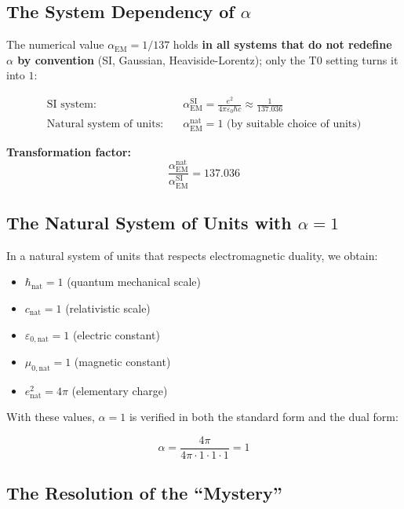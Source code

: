 \subsection{The System Dependency of $\alpha$}
\label{subsec:alpha_system_dependency}

The numerical value $\alpha_{\text{EM}} = 1/137$ holds \textbf{in all systems that do not redefine $\alpha$ by convention} (SI, Gaussian, Heaviside-Lorentz); only the T0 setting turns it into $1$:

\begin{align}
	\text{SI system:} \quad &\alpha_{\text{EM}}^{\text{SI}} = \frac{e^2}{4\pi\varepsilon_0\hbar c} \approx \frac{1}{137.036} \\
	\text{Natural system of units:} \quad &\alpha_{\text{EM}}^{\text{nat}} = 1 \text{ (by suitable choice of units)}
\end{align}

\textbf{Transformation factor:}
\begin{equation}
	\frac{\alpha_{\text{EM}}^{\text{nat}}}{\alpha_{\text{EM}}^{\text{SI}}} = 137.036
\end{equation}

\subsection{The Natural System of Units with $\alpha = 1$}
\label{subsec:natural_units}

In a natural system of units that respects electromagnetic duality, we obtain:

\begin{itemize}
	\item $\hbar_{\text{nat}} = 1$ (quantum mechanical scale)
	\item $c_{\text{nat}} = 1$ (relativistic scale)
	\item $\varepsilon_{0,\text{nat}} = 1$ (electric constant)
	\item $\mu_{0,\text{nat}} = 1$ (magnetic constant)
	\item $e_{\text{nat}}^2 = 4\pi$ (elementary charge)
\end{itemize}

With these values, $\alpha = 1$ is verified in both the standard form and the dual form:

\begin{equation}
	\alpha = \frac{4\pi}{4\pi \cdot 1 \cdot 1 \cdot 1} = 1
\end{equation}

\subsection{The Resolution of the ``Mystery''}
\label{subsec:mystery_resolution}


